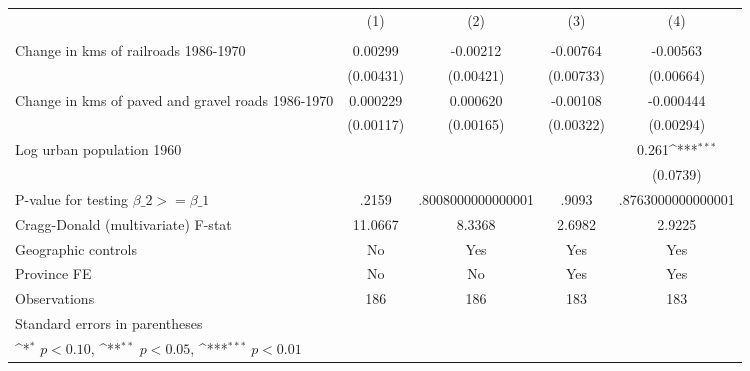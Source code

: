 {
\def\sym#1{\ifmmode^{#1}\else\(^{#1}\)\fi}
\begin{tabular}{l*{4}{c}}
\hline\hline
                &\multicolumn{1}{c}{(1)}&\multicolumn{1}{c}{(2)}&\multicolumn{1}{c}{(3)}&\multicolumn{1}{c}{(4)}\\
                &\multicolumn{1}{c}{}&\multicolumn{1}{c}{}&\multicolumn{1}{c}{}&\multicolumn{1}{c}{}\\
\hline
Change in kms of railroads 1986-1970&  0.00299         & -0.00212         & -0.00764         & -0.00563         \\
                &(0.00431)         &(0.00421)         &(0.00733)         &(0.00664)         \\
[1em]
Change in kms of paved and gravel roads 1986-1970& 0.000229         & 0.000620         & -0.00108         &-0.000444         \\
                &(0.00117)         &(0.00165)         &(0.00322)         &(0.00294)         \\
[1em]
Log urban population 1960&                  &                  &                  &    0.261\sym{***}\\
                &                  &                  &                  & (0.0739)         \\
\hline
P-value for testing $\beta\_{2} >= \beta\_{1}$&    .2159         &.8008000000000001         &    .9093         &.8763000000000001         \\
Cragg-Donald (multivariate) F-stat&  11.0667         &   8.3368         &   2.6982         &   2.9225         \\
Geographic controls&       No         &      Yes         &      Yes         &      Yes         \\
Province FE     &       No         &       No         &      Yes         &      Yes         \\
Observations    &      186         &      186         &      183         &      183         \\
\hline\hline
\multicolumn{5}{l}{\footnotesize Standard errors in parentheses}\\
\multicolumn{5}{l}{\footnotesize \sym{*} \(p<0.10\), \sym{**} \(p<0.05\), \sym{***} \(p<0.01\)}\\
\end{tabular}
}
